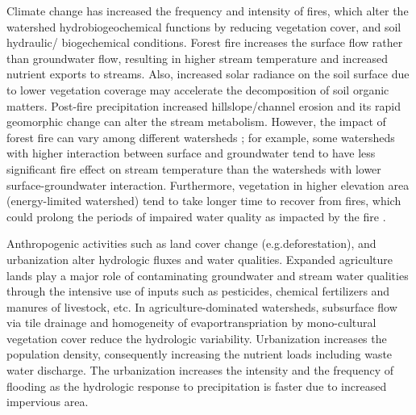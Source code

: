 \documentclass[preprint,review, 12pt]{elsarticle}
\begin{document}
Climate change has increased the frequency and intensity of fires, which alter the watershed hydrobiogeochemical functions by reducing vegetation cover, and soil hydraulic/ biogechemical conditions. Forest fire increases the surface flow rather than groundwater flow, resulting in higher stream temperature\citep{Wagner2014a} and increased nutrient exports to streams\citep{Hanan2017}. Also, increased solar radiance on the soil surface due to lower vegetation coverage may accelerate the decomposition of soil organic matters\citep{Wagner2014a}. Post-fire precipitation increased hillslope/channel erosion and its rapid geomorphic change can alter the stream metabolism\citep{Tuckett2016}. However, the impact of forest fire can vary among different watersheds \citep{Oda2018}; for example, some watersheds with higher interaction between surface and groundwater tend to have less significant fire effect on stream temperature than the watersheds with lower surface-groundwater interaction\citep{Wagner2014a}. Furthermore, vegetation in higher elevation area (energy-limited watershed) tend to take longer time to recover from fires, which could prolong the periods of impaired water quality as impacted by the fire \citep{Wagner2014a}.

Anthropogenic activities such as land cover change (e.g.deforestation), and urbanization alter hydrologic fluxes and water qualities. Expanded agriculture lands play a major role of contaminating groundwater and stream water qualities through the intensive use of inputs such as pesticides, chemical fertilizers and manures of livestock, etc. In agriculture-dominated watersheds, subsurface flow via tile drainage and homogeneity of evaportranspriation by mono-cultural vegetation cover reduce the hydrologic variability. Urbanization increases the population density, consequently increasing the nutrient loads including waste water discharge. The urbanization increases the intensity and the frequency of flooding as the hydrologic response to precipitation is faster due to increased impervious area.  
\end{document}
